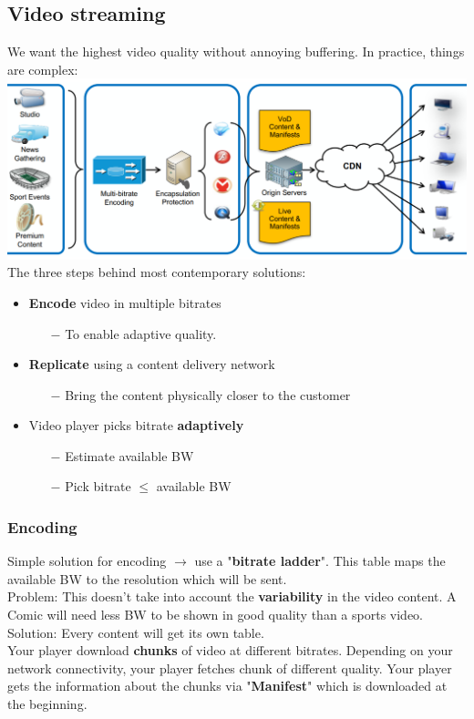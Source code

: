 \documentclass[a4paper, fontsize=8pt, landscape, DIV=1]{scrartcl}
\begin{document}
\begin{multicols*}{4}
		\subsection{Video streaming}
		We want the highest video quality without annoying buffering. In practice,
		things are complex:\\
		\includegraphics[width=\columnwidth]{images/Application_Layer/netflix_way.png}
		The three steps behind most contemporary solutions:
		\begin{itemize}[noitemsep]
			\item \textbf{Encode} video in multiple bitrates
			\begin{itemize}
				\item[$-$] To enable adaptive quality.
			\end{itemize}
			\item \textbf{Replicate} using a content delivery network
			\begin{itemize}
				\item[$-$] Bring the content physically closer to the customer
			\end{itemize}
			\item Video player picks bitrate \textbf{adaptively}
			\begin{itemize}
				\item[$-$] Estimate available BW
				\item[$-$] Pick bitrate $\le$ available BW
			\end{itemize}
		\end{itemize}
		
		\subsubsection{Encoding}
		Simple solution for encoding $\rightarrow$ use a "\textbf{bitrate ladder}".
		This table maps the available BW to the resolution which will be sent.\\
		Problem: This doesn't take into account the \textbf{variability} in the video
		content. A Comic will need less BW to be shown in good quality than a sports
		video. \\
		Solution: Every content will get its own table. \\
		Your player download \textbf{chunks} of video at different bitrates. Depending
		on your network connectivity, your player fetches chunk of different quality.
		Your player gets the information about the chunks via "\textbf{Manifest}" which
		is downloaded at the beginning.\\
		

\end{multicols*}
\end{document}
